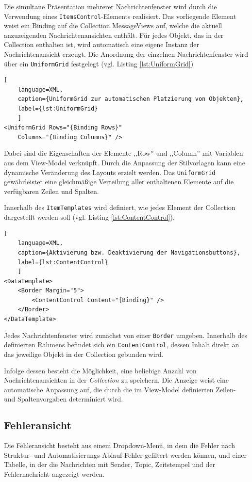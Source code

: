 Die simultane Präsentation mehrerer Nachrichtenfenster wird durch die Verwendung eines \lstinline|ItemsControl|-Elements realisiert. Das vorliegende Element weist ein Binding auf die Collection MessageViews auf, welche die aktuell anzuzeigenden Nachrichtenansichten enthält. Für jedes Objekt, das in der Collection enthalten ist, wird automatisch eine eigene Instanz der Nachrichtenansicht erzeugt. Die Anordnung der einzelnen Nachrichtenfenster wird über ein \lstinline|UniformGrid| festgelegt (vgl. Listing \ref{lst:UniformGrid})

\begin{lstlisting}[
    language=XML,
    caption={UniformGrid zur automatischen Platzierung von Objekten},
    label={lst:UniformGrid}
    ]
<UniformGrid Rows="{Binding Rows}"
 	Columns="{Binding Columns}" />
\end{lstlisting}

Dabei sind die Eigenschaften der Elemente ,,Row'' und ,,Column'' mit Variablen aus dem View-Model verknüpft. Durch die Anpassung der Stilvorlagen kann eine dynamische Veränderung des Layouts erzielt werden. Das \lstinline|UniformGrid| gewährleistet eine gleichmäßige Verteilung aller enthaltenen Elemente auf die verfügbaren Zeilen und Spalten.

Innerhalb des \lstinline|ItemTemplates| wird definiert, wie jedes Element der Collection dargestellt werden soll (vgl. Listing \ref{lst:ContentControl}).
\begin{lstlisting}[
    language=XML,
    caption={Aktivierung bzw. Deaktivierung der Navigationsbuttons},
    label={lst:ContentControl}
    ]
<DataTemplate>
    <Border Margin="5">
        <ContentControl Content="{Binding}" />
    </Border>
</DataTemplate>
\end{lstlisting}

Jedes Nachrichtenfenster wird zunächst von einer \lstinline|Border| umgeben. Innerhalb des definierten Rahmens befindet sich ein \lstinline|ContentControl|, dessen Inhalt direkt an das jeweilige Objekt in der Collection gebunden wird.

Infolge dessen besteht die Möglichkeit, eine beliebige Anzahl von Nachrichtenansichten in der \textit{Collection} zu speichern. Die Anzeige weist eine automatische Anpassung auf, die durch die im View-Model definierten Zeilen- und Spaltenvorgaben determiniert wird.
\subsection{Fehleransicht}
Die Fehleransicht besteht aus einem Dropdown-Menü, in dem die Fehler nach Struktur- und Automatisierungs-Ablauf-Fehler gefiltert werden können, und einer Tabelle, in der die Nachrichten mit Sender, Topic, Zeitstempel und der Fehlernachricht angezeigt werden. 

